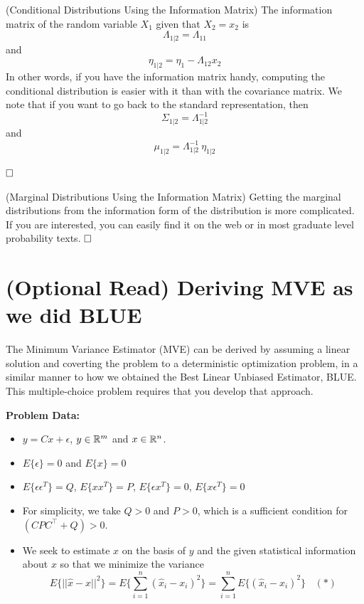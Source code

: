 {\begin{fact} (Conditional Distributions Using the Information Matrix) The information matrix of the random variable $X_1$ given that $X_2=x_2$ is
 $$\Lambda_{1|2} = \Lambda_{11}$$
 and
 $$\eta_{1|2} = \eta_1 - \Lambda_{12}x_2$$
 In other words, if you have the information matrix handy, computing the conditional distribution is easier with it than with the covariance matrix.  We note that if you want to go back to the standard representation, then
 $$ \Sigma_{1|2} = \Lambda_{1|2} ^{-1}$$
 and
  $$\mu_{1|2} =  \Lambda_{1|2} ^{-1} ~ \eta_{1|2} $$

$\hfill \square$  \end{fact}

\begin{rem} (Marginal Distributions Using the Information Matrix) Getting the marginal distributions from the information form of the distribution is more complicated.  If you are interested, you can easily find it on the web or in most graduate level probability texts.
$\hfill \square$  \end{rem}



\section{(Optional Read) Deriving MVE as we did BLUE}

\begin{example}  The Minimum Variance Estimator (MVE) can be derived by assuming a linear solution and coverting the problem to a deterministic optimization problem, in a similar manner to how we obtained the Best Linear Unbiased Estimator, BLUE. This multiple-choice problem requires that you develop that approach.

  \noindent  \textbf{Problem Data:}
  \begin{itemize}
  \item $y = Cx + \epsilon$, $y \in \mathbb R^m$ and $x \in \mathbb R^n$.
  \item $E\{\epsilon \} = 0$ and $E\{ x \}=0$
  \item $E\{ \epsilon \epsilon^T \} = Q $,  $E\{ x x^T \} = P $,  $E\{ \epsilon x^T \} = 0 $, $E\{ x \epsilon^T \} = 0 $
  \item For simplicity, we take $Q >0$ and $P>0$, which is a sufficient condition for $(C P C^\top + Q)>0$.
  \item We seek to estimate $x$ on the basis of $y$ and the given statistical information about $x$ so that we minimize the variance
      $$E\{ ||\hat{x} - x||^2 \} = E\{ \sum_{i=1}^n \left( \hat{x}_i - x_i \right)^2 \} =  \sum_{i=1}^nE\{ \left( \hat{x}_i - x_i \right)^2 \} ~~~~(*) $$


\end{itemize}
\end{example}}
